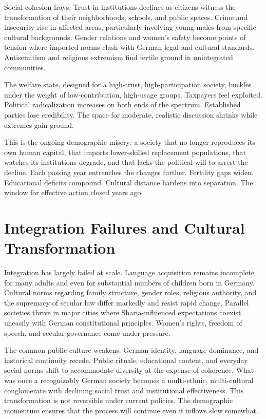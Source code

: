 ﻿\documentclass[12pt,a4paper]{book}
\begin{document}
Social cohesion frays. Trust in institutions declines as citizens witness the transformation of their neighborhoods, schools, and public spaces. Crime and insecurity rise in affected areas, particularly involving young males from specific cultural backgrounds. Gender relations and women's safety become points of tension where imported norms clash with German legal and cultural standards. Antisemitism and religious extremism find fertile ground in unintegrated communities.

The welfare state, designed for a high-trust, high-participation society, buckles under the weight of low-contribution, high-usage groups. Taxpayers feel exploited. Political radicalization increases on both ends of the spectrum. Established parties lose credibility. The space for moderate, realistic discussion shrinks while extremes gain ground.

This is the ongoing demographic misery: a society that no longer reproduces its own human capital, that imports lower-skilled replacement populations, that watches its institutions degrade, and that lacks the political will to arrest the decline. Each passing year entrenches the changes further. Fertility gaps widen. Educational deficits compound. Cultural distance hardens into separation. The window for effective action closed years ago.

\section{Integration Failures and Cultural Transformation}

Integration has largely failed at scale. Language acquisition remains incomplete for many adults and even for substantial numbers of children born in Germany. Cultural norms regarding family structure, gender roles, religious authority, and the supremacy of secular law differ markedly and resist rapid change. Parallel societies thrive in major cities where Sharia-influenced expectations coexist uneasily with German constitutional principles. Women's rights, freedom of speech, and secular governance come under pressure.

The common public culture weakens. German identity, language dominance, and historical continuity recede. Public rituals, educational content, and everyday social norms shift to accommodate diversity at the expense of coherence. What was once a recognizably German society becomes a multi-ethnic, multi-cultural conglomerate with declining social trust and institutional effectiveness. This transformation is not reversible under current policies. The demographic momentum ensures that the process will continue even if inflows slow somewhat.
\end{document}
